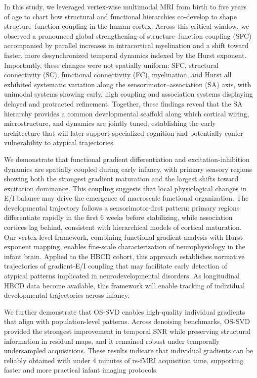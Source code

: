 In this study, we leveraged vertex-wise multimodal MRI from birth to five years of age to chart how structural and functional hierarchies co-develop to shape structure–function coupling in the human cortex. Across this critical window, we observed a pronounced global strengthening of structure–function coupling (SFC) accompanied by parallel increases in intracortical myelination and a shift toward faster, more desynchronized temporal dynamics indexed by the Hurst exponent. Importantly, these changes were not spatially uniform: SFC, structural connectivity (SC), functional connectivity (FC), myelination, and Hurst all exhibited systematic variation along the sensorimotor–association (SA) axis, with unimodal systems showing early, high coupling and association systems displaying delayed and protracted refinement. Together, these findings reveal that the SA hierarchy provides a common developmental scaffold along which cortical wiring, microstructure, and dynamics are jointly tuned, establishing the early architecture that will later support specialized cognition and potentially confer vulnerability to atypical trajectories.

We demonstrate that functional gradient differentiation and excitation-inhibition dynamics are spatially coupled during early infancy, with primary sensory regions showing both the strongest gradient maturation and the largest shifts toward excitation dominance. This coupling suggests that local physiological changes in E/I balance may drive the emergence of macroscale functional organization. The developmental trajectory follows a sensorimotor-first pattern: primary regions differentiate rapidly in the first 6 weeks before stabilizing, while association cortices lag behind, consistent with hierarchical models of cortical maturation. Our vertex-level framework, combining functional gradient analysis with Hurst exponent mapping, enables fine-scale characterization of neurophysiology in the infant brain. Applied to the HBCD cohort, this approach establishes normative trajectories of gradient-E/I coupling that may facilitate early detection of atypical patterns implicated in neurodevelopmental disorders. As longitudinal HBCD data become available, this framework will enable tracking of individual developmental trajectories across infancy.

We further demonstrate that OS-SVD enables high-quality individual gradients that align with population-level patterns. Across denoising benchmarks, OS-SVD provided the strongest improvement in temporal SNR while preserving structural information in residual maps, and it remained robust under temporally undersampled acquisitions. These results indicate that individual gradients can be reliably obtained with under 4 minutes of rs-fMRI acquisition time, supporting faster and more practical infant imaging protocols.

